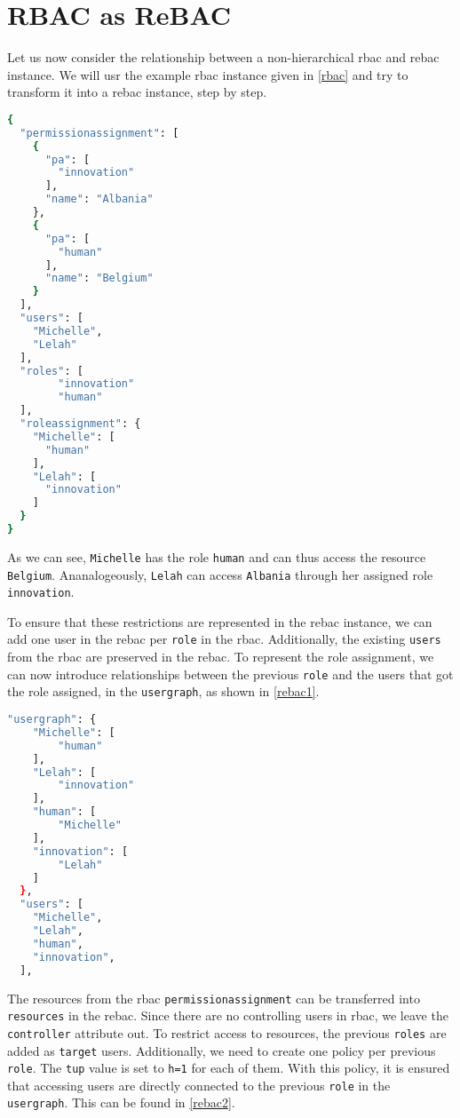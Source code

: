 \documentclass{semdoc}
\begin{document}
\section{RBAC as ReBAC}
Let us now consider the relationship between a non-hierarchical \gls{rbac} and \gls{rebac} instance.
We will usr the example \gls{rbac} instance given in \cref{rbac} and try to transform it into a \gls{rebac} instance, step by step.

\begin{lstlisting}[float, language=bash, label={rbac}, caption={Example of a non-hierarchical RBAC instance}]
{
  "permissionassignment": [
    {
      "pa": [
        "innovation"
      ], 
      "name": "Albania"
    },
    {
      "pa": [
        "human"
      ], 
      "name": "Belgium"
    }
  ], 
  "users": [
    "Michelle", 
    "Lelah"
  ], 
  "roles": [
        "innovation"
        "human"
  ], 
  "roleassignment": {
    "Michelle": [
      "human"
    ], 
    "Lelah": [
      "innovation"
    ]
  }
}
\end{lstlisting}

As we can see, \texttt{Michelle} has the role \texttt{human} and can thus access the resource \texttt{Belgium}. Ananalogeously, \texttt{Lelah} can access \texttt{Albania} through her assigned role \texttt{innovation}.

To ensure that these restrictions are represented in the \gls{rebac} instance, we can add one user in the \gls{rebac} per \texttt{role} in the \gls{rbac}.
Additionally, the existing \texttt{users} from the \gls{rbac} are preserved in the \gls{rebac}. 
To represent the role assignment, we can now introduce relationships between the previous \texttt{role} and the users that got the role assigned, in the \texttt{usergraph}, as shown in \cref{rebac1}.

\begin{lstlisting}[float, language=bash, label={rebac1}, caption={Transferring roles and users from RBAC to a ReBAC instance}]
  "usergraph": {
    "Michelle": [
        "human"    
    ],
    "Lelah": [
        "innovation"
    ],
    "human": [
        "Michelle"
    ],
    "innovation": [
        "Lelah"
    ]
  }, 
  "users": [
    "Michelle",
    "Lelah",
    "human",
    "innovation",
  ], 
\end{lstlisting}

The resources from the \gls{rbac} \texttt{permissionassignment} can be transferred into \texttt{resources} in the \gls{rebac}. Since there are no controlling users in \gls{rbac}, we leave the \texttt{controller} attribute out. 
To restrict access to resources, the previous \texttt{roles} are added as \texttt{target} users. 
Additionally, we need to create one policy per previous \texttt{role}. The \texttt{tup} value is set to \texttt{h=1} for each of them. 
With this policy, it is ensured that accessing users are directly connected to the previous \texttt{role} in the \texttt{usergraph}. 
This can be found in \cref{rebac2}.
\end{document}
